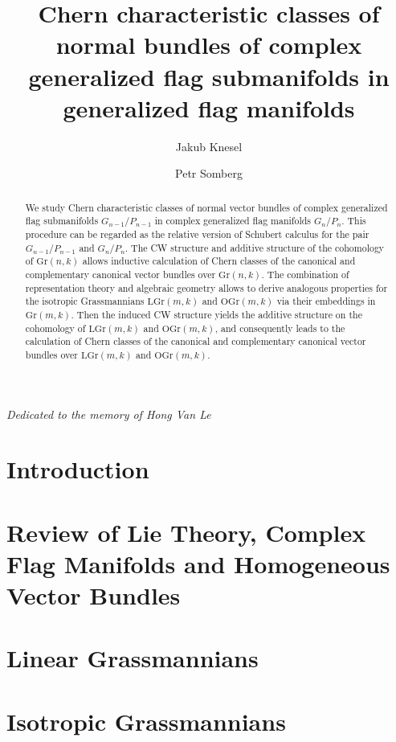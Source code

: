 \documentclass[12pt, a4paper]{amsart}
\title[Normal bundles of generalized flag submanifolds]{Chern characteristic classes of normal bundles of complex generalized flag submanifolds
in generalized flag manifolds}
\author{Jakub Knesel}
\author{Petr Somberg}
\newcommand{\gr}[2]{\mathrm{Gr}(#1, #2)}
\newcommand{\Lgr}[2]{\mathrm{LGr}(#1, #2)}
\newcommand{\Ortgr}[2]{\mathrm{OGr}(#1, #2)}
\theoremstyle{definition}
\theoremstyle{remark}
\begin{document}
\maketitle

\begin{center}
 {\itshape Dedicated to the memory of Hong Van Le}
\end{center}

\begin{abstract}
    We study Chern characteristic classes of normal vector bundles of 
		complex generalized flag submanifolds $G_{n-1}/P_{n-1}$ in complex 
		generalized flag manifolds $G_n/P_n$. This procedure can be regarded
		as the relative version of Schubert calculus for the pair $G_{n-1}/P_{n-1}$
		and $G_n/P_n$. The CW structure and additive structure 
		of the cohomology of $\gr{n}{k}$ allows inductive calculation of  
		Chern classes of the canonical and complementary canonical vector bundles 
		over $\gr{n}{k}$. The combination of representation theory and 
    algebraic geometry allows to derive analogous properties for the isotropic Grassmannians 
		$\Lgr{m}{k}$ and $\Ortgr{m}{k}$ via their embeddings in $\gr{m}{k}$. Then the 
		induced CW structure yields the additive structure on the cohomology of $\Lgr{m}{k}$ and $\Ortgr{m}{k}$, 
		and consequently leads to the calculation of Chern classes of the canonical and 
		complementary canonical vector bundles over $\Lgr{m}{k}$ and $\Ortgr{m}{k}$.
		
\end{abstract}

\tableofcontents

\section{Introduction}


\section{Review of Lie Theory, Complex Flag Manifolds and Homogeneous Vector Bundles}


\section{Linear Grassmannians}


\section{Isotropic Grassmannians}




\end{document}
